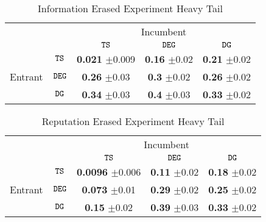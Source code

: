 \documentclass[../competing_bandits.tex]{subfiles}
\begin{document}
\begin{table}[ht]
\centering
\begin{tabular}{cc|c|c|c|}
  & \multicolumn{1}{c}{} & \multicolumn{3}{c}{Incumbent} \\
  & \multicolumn{1}{c}{} & \multicolumn{1}{c}{$\mathtt{TS}$}  & \multicolumn{1}{c}{$\mathtt{DEG}$}  & \multicolumn{1}{c}{$\mathtt{DG}$} \\\cline{3-5}
            & $\mathtt{TS}$ & \makecell{\textbf{0.021} \\$\pm$0.009}& 		\makecell{\textbf{0.16} \\$\pm$0.02} & 
            \makecell{\textbf{0.21} \\ $\pm$0.02} \\ \cline{3-5}
Entrant  & $\mathtt{DEG}$ & \makecell{\textbf{0.26} \\$\pm$0.03} & \makecell{\textbf{0.3} \\$\pm$0.02} & 
\makecell{\textbf{0.26} \\ $\pm$0.02} \\ \cline{3-5}
            & $\mathtt{DG}$ & \makecell{\textbf{0.34} \\ $\pm$0.03} & \makecell{\textbf{0.4} \\$\pm$0.03} & 
            \makecell{\textbf{0.33} \\$\pm$0.02} \\\cline{3-5}
\end{tabular}
\caption{Information Erased Experiment Heavy Tail}
\label{info_erase}
\end{table}

\begin{table}[ht]
\centering
\begin{tabular}{cc|c|c|c|}
  & \multicolumn{1}{c}{} & \multicolumn{3}{c}{Incumbent} \\
  & \multicolumn{1}{c}{} & \multicolumn{1}{c}{$\mathtt{TS}$}  & \multicolumn{1}{c}{$\mathtt{DEG}$}  & \multicolumn{1}{c}{$\mathtt{DG}$} \\\cline{3-5}
            & $\mathtt{TS}$ & \makecell{\textbf{0.0096} \\$\pm$0.006}& 		\makecell{\textbf{0.11} \\$\pm$0.02} & 
            \makecell{\textbf{0.18} \\$\pm$0.02} \\ \cline{3-5}
Entrant  & $\mathtt{DEG}$ & \makecell{\textbf{0.073} \\ $\pm$0.01} & \makecell{\textbf{0.29} \\ $\pm$0.02} & 
\makecell{\textbf{0.25} \\$\pm$0.02} \\ \cline{3-5}
            & $\mathtt{DG}$ &\makecell{\textbf{0.15} \\$\pm$0.02} & \makecell{\textbf{0.39} \\$\pm$0.03} & 
           \makecell{\textbf{0.33} \\ $\pm$0.02} \\\cline{3-5}
\end{tabular}
\caption{Reputation Erased Experiment Heavy Tail}
\label{rep_erase}
\end{table}
\end{document}
